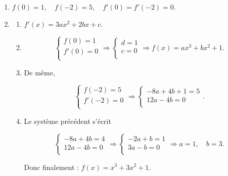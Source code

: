 \begin{enumerate}
	\item $f(0) = 1, \quad f(-2) = 5, \quad f'(0) = f'(-2) = 0.$
	
	\item \begin{enumerate}
	\item	$f'(x) = 3ax^2 + 2bx + c.$
	\item 
	
	\[
	\begin{cases}
		f(0) = 1 \\
		f'(0) = 0 \\
	\end{cases}
	\Rightarrow
	\begin{cases}
		d = 1 \\
		c = 0 \\
	\end{cases}
	\Rightarrow f(x) = ax^3 + bx^2 + 1.
	\]
	
	\item De même,
	
	\[
	\begin{cases}
		f(-2) = 5 \\
		f'(-2) = 0 \\
	\end{cases}
	\Rightarrow
	\begin{cases}
		-8a + 4b + 1 = 5 \\
		12a - 4b = 0 \\
	\end{cases}.
	\]
	
		\item Le système précédent s'écrit
	
	\[
	\begin{cases}
		-8a + 4b = 4 \\
		12a - 4b = 0 \\
	\end{cases}
	\Rightarrow
	\begin{cases}
		-2a + b = 1 \\
		3a - b = 0 \\
	\end{cases}
	\Rightarrow a = 1, \quad b = 3.
	\]
	
	Donc finalement : \(f(x) = x^3 + 3x^2 + 1\).
\end{enumerate}
\end{enumerate}
